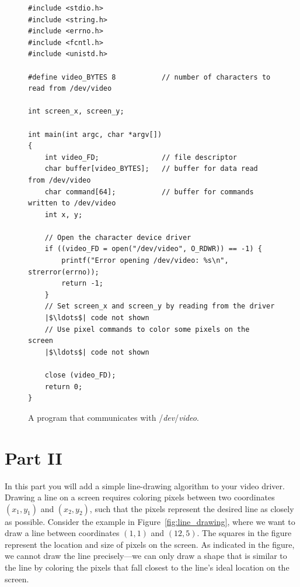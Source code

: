 \documentclass[epsfig,10pt,fullpage]{article}
\begin{document}
\lstset{language=C,numbers=none}
\begin{figure}[H]
\begin{center}
\begin{minipage}[t]{15 cm}
\begin{lstlisting}[name=part1]
#include <stdio.h>
#include <string.h>
#include <errno.h>
#include <fcntl.h>
#include <unistd.h>

#define video_BYTES 8			// number of characters to read from /dev/video

int screen_x, screen_y;

int main(int argc, char *argv[])
{
    int video_FD;				// file descriptor
    char buffer[video_BYTES];	// buffer for data read from /dev/video
    char command[64];			// buffer for commands written to /dev/video
    int x, y;
    
    // Open the character device driver
    if ((video_FD = open("/dev/video", O_RDWR)) == -1) {
        printf("Error opening /dev/video: %s\n", strerror(errno));
        return -1;
    }
    // Set screen_x and screen_y by reading from the driver
    |$\ldots$| code not shown
    // Use pixel commands to color some pixels on the screen
    |$\ldots$| code not shown

    close (video_FD);
    return 0;
}
\end{lstlisting}
\end{minipage}
\vspace{-0.5cm}
\caption{A program that communicates with /{\it dev}/{\it video}.}
\label{fig:part1}
\end{center}
\end{figure}

\vspace{-1cm}
\section*{Part II}

\noindent
In this part you will add a simple line-drawing algorithm to your video driver.
Drawing a line on a screen requires coloring pixels between two coordinates $(x_1,y_1)$ and 
$(x_2,y_2)$, such that the pixels represent the desired line as closely as possible. Consider 
the example in Figure~\ref{fig:line_drawing}, where we want to draw a line between 
coordinates $(1,1)$ and $(12,5)$. The squares in the figure represent the location and 
size of pixels on the screen. As indicated in the figure, we cannot draw the line 
precisely---we can only draw a shape that is similar to the line by coloring the pixels that 
fall closest to the line's ideal location on the screen.
\end{document}
